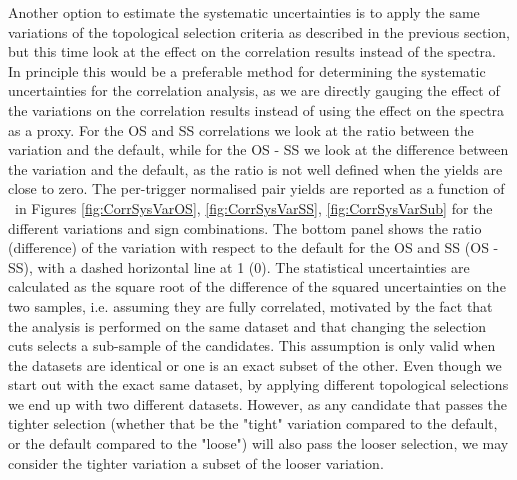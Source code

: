    Another option to estimate the systematic uncertainties is to apply the same variations of the topological selection criteria as described in the previous section, but this time look at the effect on the correlation results instead of the spectra. In principle this would be a preferable method for determining the systematic uncertainties for the correlation analysis, as we are directly gauging the effect of the variations on the correlation results instead of using the effect on the spectra as a proxy. 
  For the OS and SS correlations we look at the ratio between the variation and the default, while for the OS - SS we look at the difference between the variation and the default, as the ratio is not well defined when the yields are close to zero. The per-trigger normalised pair yields are reported as a function of \dphi\ in Figures \ref{fig:CorrSysVarOS}, \ref{fig:CorrSysVarSS}, \ref{fig:CorrSysVarSub} for the different variations and sign combinations. The bottom panel shows the ratio (difference) of the variation with respect to the default for the OS and SS (OS - SS), with a dashed horizontal line at 1 (0). The statistical uncertainties are calculated as the square root of the difference of the squared uncertainties on the two samples,  i.e. assuming they are fully correlated, motivated by the fact that the analysis is performed on the same dataset and that changing the selection cuts selects a sub-sample of the candidates. This assumption is only valid when the datasets are identical or one is an exact subset of the other. Even though we start out with the exact same dataset, by applying different topological selections we end up with two different datasets. However, as any candidate that passes the tighter selection (whether that be the "tight" variation compared to the default, or the default compared to the "loose") will also pass the looser selection, we may consider the tighter variation a subset of the looser variation. 
  
